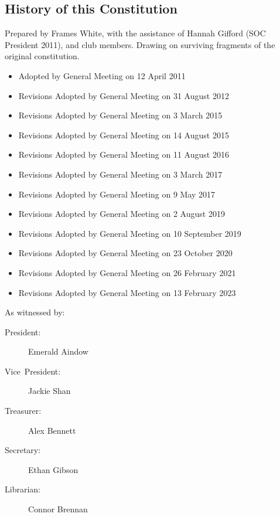 \documentclass[a4paper]{article}
\begin{document}
\begin{appendices}

    \section{History of this Constitution} \label{sec:app:history}

    \noindent Prepared by Frames White, with the assistance of Hannah Gifford (SOC President 2011), and club members. Drawing on surviving fragments of the original constitution.

    \medskip{}

    \begin{itemize}[label={}]
        \item Adopted by General Meeting on 12 April 2011
        \item Revisions Adopted by General Meeting on 31 August 2012
        \item Revisions Adopted by General Meeting on 3 March 2015
        \item Revisions Adopted by General Meeting on 14 August 2015
        \item Revisions Adopted by General Meeting on 11 August 2016
        \item Revisions Adopted by General Meeting on 3 March 2017
        \item Revisions Adopted by General Meeting on 9 May 2017
        \item Revisions Adopted by General Meeting on 2 August 2019
        \item Revisions Adopted by General Meeting on 10 September 2019
        \item Revisions Adopted by General Meeting on 23 October 2020
        \item Revisions Adopted by General Meeting on 26 February 2021
        \item Revisions Adopted by General Meeting on 13 February 2023
    \end{itemize}

    \medskip{}

    \noindent As witnessed by:
    \begin{description}
        \item[{President:}] Emerald Aindow
        \item[{Vice~President:}] Jackie Shan
        \item[{Treasurer:}] Alex Bennett
        \item[{Secretary:}] Ethan Gibson
        \item[{Librarian:}] Connor Brennan
    \end{description}

\end{appendices}
\end{document}

